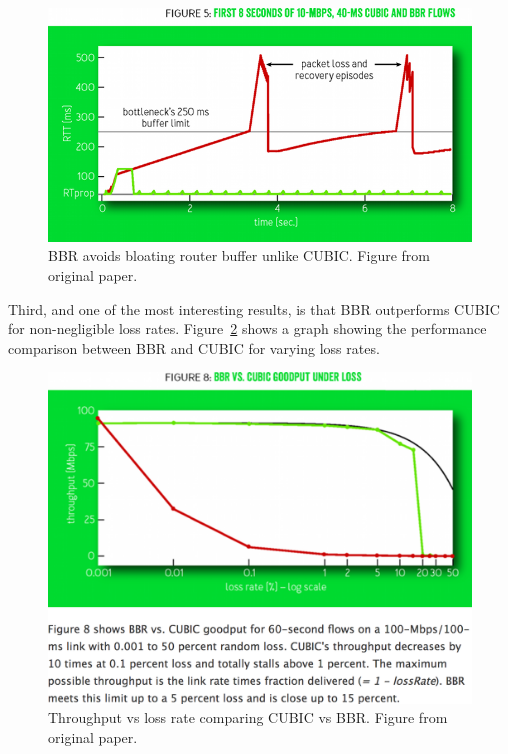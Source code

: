 \begin{figure}[h]
  \centering
  \includegraphics[width=1.0\columnwidth]{./img/bbr_fig5.png}
  \caption{BBR avoids bloating router buffer unlike CUBIC. Figure from original paper.}
  \label{fig:bbr5}
\end{figure}

Third, and one of the most interesting results, is that BBR outperforms
CUBIC for non-negligible loss rates. Figure~\ref{fig:bbr8} shows a graph
showing the performance comparison between BBR and CUBIC for varying loss rates.

\begin{figure}[h]
  \centering
  \includegraphics[width=1.0\columnwidth]{./img/bbr_fig8.png}
  \caption{Throughput vs loss rate comparing CUBIC vs BBR. Figure from original paper.}
  \label{fig:bbr8}
\end{figure}

